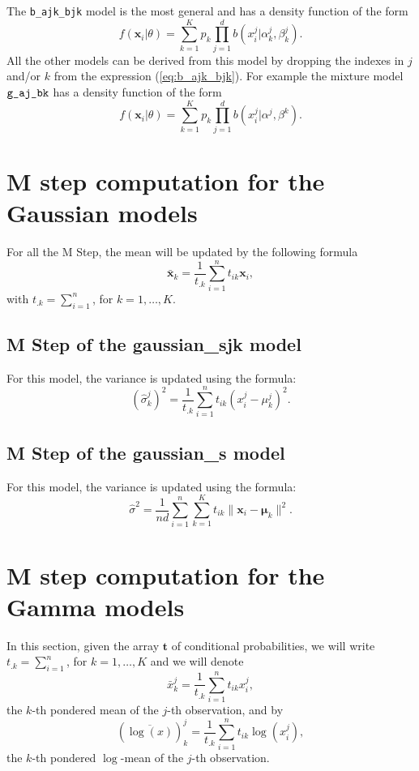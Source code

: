 \documentclass[a4paper,10pt]{article}
\newcommand{\bx}{\mathbf{x}}
\newcommand{\bt}{\mathbf{t}}
\newcommand{\bmu}{\boldsymbol{\mu}}
\begin{document}
The \verb+b_ajk_bjk+ model is the most general and has a density function of the form
\begin{equation}\label{eq:b_ajk_bjk}
  f({\bx}_i|\theta) = \sum_{k=1}^K p_k \prod_{j=1}^d b(x^j_{i}| \alpha^j_{k},\beta^j_{k}).
\end{equation}
All the other models can be derived from this model by dropping the indexes in $j$ and/or $k$
from the expression (\ref{eq:b_ajk_bjk}). For example the mixture model $\verb+g_aj_bk+$ has a density
function of the form
\begin{equation}\label{eq:b_aj_bk}
  f({\bx}_i|\theta) = \sum_{k=1}^K p_k \prod_{j=1}^d b(x^j_{i}| \alpha^j,\beta^{k}).
\end{equation}




\appendix

\section{M step computation for the Gaussian models}

For all the M Step, the mean will be updated by the following formula
$$
\bar{\bx}_k = \frac{1}{t_{.k}} \sum_{i=1}^n t_{ik} \bx_i,
$$
with $t_{.k} = \sum_{i=1}^n$, for $k=1,\ldots,K$.

\subsection{M Step of the gaussian\_sjk model}

For this model, the variance is updated using the formula:
$$
(\hat{\sigma}^j_k)^2 = \frac{1}{t_{.k}} \sum_{i=1}^n t_{ik} (x^j_i-\mu^j_k)^2.
$$

\subsection{M Step of the gaussian\_s model}

For this model, the variance is updated using the formula:
$$
\hat{\sigma}^2 = \frac{1}{nd} \sum_{i=1}^n \sum_{k=1}^K t_{ik} \|\bx_i-\bmu_k\|^2.
$$

\section{M step computation for the Gamma models}
In this section, given the array $\bt$ of conditional probabilities, we will write
$t_{.k} = \sum_{i=1}^n$, for $k=1,\ldots,K$ and we will denote
$$
\bar{x}^j_k = \frac{1}{t_{.k}} \sum_{i=1}^n t_{ik} x^j_i,
$$
the $k$-th pondered mean of the $j$-th observation, and by
$$
(\overline{\log(x)})^j_k = \frac{1}{t_{.k}} \sum_{i=1}^n t_{ik} \log(x^j_i),
$$
the $k$-th pondered $\log$-mean of the $j$-th observation.
\end{document}
